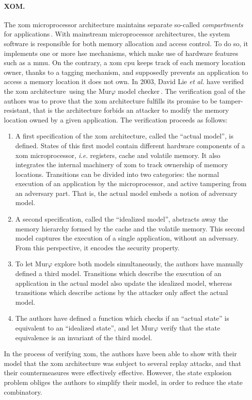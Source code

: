 \paragraph{XOM.}
%
The \ac{xom} microprocessor architecture maintains separate so-called
\emph{compartments} for applications\,\cite{lie2000architectural}.
%
With mainstream microprocessor architectures, the system software is responsible
for both memory allocation and access control.
%
To do so, it implements one or more \ac{hse} mechanisms, which make use of
hardware features such as a \ac{mmu}.
%
On the contrary, a \ac{xom} \ac{cpu} keeps track of each memory location owner,
thanks to a tagging mechanism, and supposedly prevents an application to access
a memory location it does not own.
%
In 2003, David Lie \emph{et al.} have verified the \ac{xom}
architecture\,\cite{lie2003xom} using the Mur$\varphi$ model
checker\,\cite{murphi}.
%
The verification goal of the authors was to prove that the \ac{xom}
architecture fulfills its promise to be tamper-resistant, that is the
architecture forbids an attacker to modify the memory location owned by a given
application.
%
The verification proceeds as follows:
%
\begin{enumerate}
\item A first specification of the \ac{xom} architecture, called the ``actual
  model'', is defined.
  States of this first model contain different hardware components of a
  \ac{xom} microprocessor, \emph{i.e.} registers, cache and volatile
  memory.
  It also integrates the internal machinery of \ac{xom} to track ownership of
  memory locations.
  Transitions can be divided into two categories: the normal execution of an
  application by the microprocessor, and active tampering from an adversary
  part.
  That is, the actual model embeds a notion of adversary model.
\item A second specification, called the ``idealized model'', abstracts away the
  memory hierarchy formed by the cache and the volatile memory.
  This second model captures the execution of a single application, without an
  adversary.
  From this perspective, it encodes the security property.
\item To let Mur\( \varphi \) explore both models simultaneously, the authors
  have manually defined a third model.
  Transitions which describe the execution of an application in the actual
  model also update the idealized model, whereas transitions which describe
  actions by the attacker only affect the actual model.
\item The authors have defined a function which checks if an ``actual state'' is
  equivalent to an ``idealized state'', and let Mur\( \varphi \) verify that
  the state equivalence is an invariant of the third model.
\end{enumerate}
%
In the process of verifying \ac{xom}, the authors have been able to show with
their model that the \ac{xom} architecture was subject to several replay
attacks, and that their countermeasures were effectively effective.
%
However, the state explosion problem obliges the authors to simplify their
model, in order to reduce the state combinatory.

